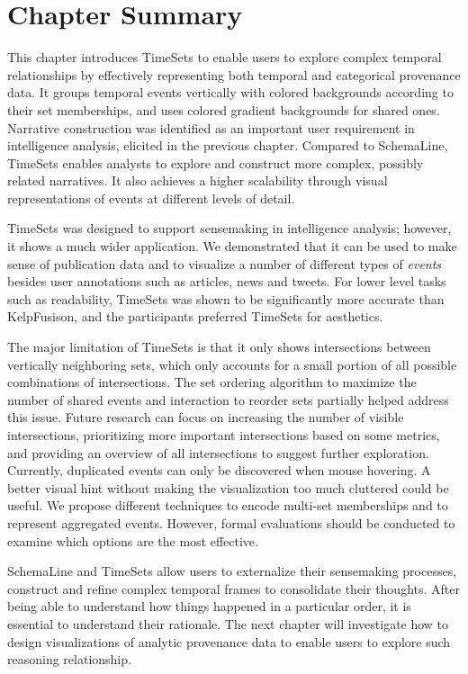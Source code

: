 \section{Chapter Summary}
This chapter introduces TimeSets to enable users to explore complex temporal relationships by effectively representing both temporal and categorical provenance data. It groups temporal events vertically with colored backgrounds according to their set memberships, and uses colored gradient backgrounds for shared ones. Narrative construction was identified as an important user requirement in intelligence analysis, elicited in the previous chapter. Compared to SchemaLine, TimeSets enables analysts to explore and construct more complex, possibly related narratives. It also achieves a higher scalability through visual representations of events at different levels of detail.

TimeSets was designed to support sensemaking in intelligence analysis; however, it shows a much wider application. We demonstrated that it can be used to make sense of publication data and to visualize a number of different types of \emph{events} besides user annotations such as articles, news and tweets. For lower level tasks such as readability, TimeSets was shown to be significantly more accurate than KelpFusison, and the participants preferred TimeSets for aesthetics.

The major limitation of TimeSets is that it only shows intersections between vertically neighboring sets, which only accounts for a small portion of all possible combinations of intersections. The set ordering algorithm to maximize the number of shared events and interaction to reorder sets partially helped address this issue. Future research can focus on increasing the number of visible intersections, prioritizing more important intersections based on some metrics, and providing an overview of all intersections to suggest further exploration. Currently, duplicated events can only be discovered when mouse hovering. A better visual hint without making the visualization too much cluttered could be useful. We propose different techniques to encode multi-set memberships and to represent aggregated events. However, formal evaluations should be conducted to examine which options are the most effective.

SchemaLine and TimeSets allow users to externalize their sensemaking processes, construct and refine complex temporal frames to consolidate their thoughts. After being able to understand how things happened in a particular order, it is essential to understand their rationale. The next chapter will investigate how to design visualizations of analytic provenance data to enable users to explore such reasoning relationship.

